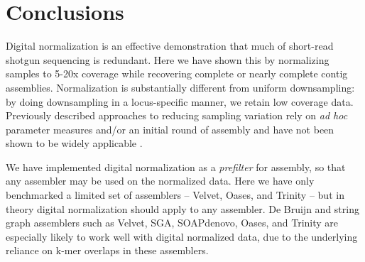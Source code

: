 \section{Conclusions}

Digital normalization is an effective demonstration
that much of short-read shotgun sequencing is redundant.  Here we have
shown this by normalizing samples to 5-20x coverage while recovering
complete or nearly complete contig assemblies.  Normalization is
substantially different from uniform downsampling: by doing
downsampling in a locus-specific manner, we retain low coverage data.
Previously described approaches to reducing sampling variation rely on
{\em ad hoc} parameter measures and/or an initial round of assembly
and have not been shown to be widely applicable
\cite{pubmed19724646,pubmed22028825}.



We have implemented digital normalization as a {\em prefilter} for assembly, so
that any assembler may be used on the normalized data.  Here we have
only benchmarked a limited set of assemblers -- Velvet, Oases, and
Trinity -- but in theory digital normalization should apply to any
assembler.  De Bruijn and string graph assemblers such as Velvet, SGA,
SOAPdenovo, Oases, and Trinity are especially likely to work well with
digital normalized data, due to the underlying reliance on k-mer
overlaps in these assemblers.


